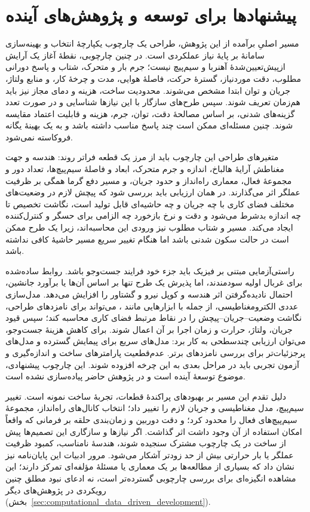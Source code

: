 \section{پیشنهادها برای توسعه و پژوهش‌های آینده}

مسیر اصلیِ برآمده از این پژوهش، طراحی یک چارچوب یکپارچهٔ انتخاب و بهینه‌سازی سامانهٔ  بر پایهٔ نیاز عملکردی است. در چنین چارچوبی، نقطهٔ آغاز یک آرایش ازپیش‌تعیین‌شدهٔ آهنربا و سیم‌پیچ نیست؛ جرم بار و متحرک، شتاب و پاسخ دورانی مطلوب، دقت موردنیاز، گسترهٔ حرکت، فاصلهٔ هوایی، مدت و چرخهٔ کار، و منابع ولتاژ، جریان و توان ابتدا مشخص می‌شوند. محدودیت ساخت، هزینه و دمای مجاز نیز باید هم‌زمان تعریف شوند. سپس طرح‌های سازگار با این نیازها شناسایی و در صورت تعدد گزینه‌های شدنی، بر اساس مصالحهٔ دقت، توان، جرم، هزینه و قابلیت اعتماد مقایسه شوند. چنین مسئله‌ای ممکن است چند پاسخ مناسب داشته باشد و به یک بهینهٔ یگانه فروکاسته نمی‌شود.

متغیرهای طراحی این چارچوب باید از مرز یک قطعه فراتر روند: هندسه و جهت مغناطش آرایهٔ هالباخ، اندازه و جرم متحرک، ابعاد و فاصلهٔ سیم‌پیچ‌ها، تعداد دور و مجموعهٔ فعال، معماری راه‌انداز و حدود جریان، و مسیر دفع گرما همگی بر ظرفیت عملگر اثر می‌گذارند. در همان ارزیابی باید بررسی شود که پیچش لازم در وضعیت‌های مختلف فضای کاری با چه جریان و چه حاشیه‌ای قابل تولید است، نگاشت تخصیص تا چه اندازه بدشرط می‌شود و دقت و نرخ بازخورد چه الزامی برای حسگر و کنترل‌کننده ایجاد می‌کند. مسیر و شتاب مطلوب نیز ورودی این محاسبه‌اند، زیرا یک طرح ممکن است در حالت سکون شدنی باشد اما هنگام تغییر سریع مسیر حاشیهٔ کافی نداشته باشد.

راستی‌آزمایی مبتنی بر فیزیک باید جزء خود فرایند جست‌وجو باشد. روابط ساده‌شده برای غربال اولیه سودمندند، اما پذیرش یک طرح تنها بر اساس آن‌ها یا برآورد جانشین، احتمال نادیده‌گرفتن اثر هندسه و کوپل نیرو و گشتاور را افزایش می‌دهد. مدل‌سازی عددی الکترومغناطیسی، از جمله با ابزارهایی مانند ، می‌تواند برای نامزدهای طراحی، نگاشت وضعیت--جریان--پیچش را در نقاط مرتبط فضای کاری محاسبه کند؛ سپس قیود جریان، ولتاژ، حرارت و زمان اجرا بر آن اعمال شوند. برای کاهش هزینهٔ جست‌وجو، می‌توان ارزیابی چندسطحی به کار برد: مدل‌های سریع برای پیمایش گسترده و مدل‌های پرجزئیات‌تر برای بررسی نامزدهای برتر. عدم‌قطعیت پارامترهای ساخت و اندازه‌گیری و آزمون تجربی باید در مراحل بعدی به این چرخه افزوده شوند. این چارچوب پیشنهادی، موضوع توسعهٔ آینده است و در پژوهش حاضر پیاده‌سازی نشده است.

دلیل تقدم این مسیر بر بهبودهای پراکندهٔ قطعات، تجربهٔ ساخت نمونه است. تغییر سیم‌پیچ، مدل مغناطیسی و جریان لازم را تغییر داد؛ انتخاب کانال‌های راه‌انداز، مجموعهٔ سیم‌پیچ‌های فعال را محدود کرد؛ و دقت دوربین و زمان‌بندی حلقه بر فرمانی که واقعاً امکان استفاده از آن وجود داشت اثر گذاشت. اگر نیازها و سازگاری این تصمیم‌ها پیش از ساخت در یک چارچوب مشترک سنجیده شوند، هندسهٔ نامناسب، کمبود ظرفیت عملگر یا بار حرارتی بیش از حد زودتر آشکار می‌شود. مرور ادبیات این پایان‌نامه نیز نشان داد که بسیاری از مطالعه‌ها بر یک معماری یا مسئلهٔ مؤلفه‌ای تمرکز دارند؛ این مشاهده انگیزه‌ای برای بررسی چارچوبی گسترده‌تر است، نه ادعای نبود مطلق چنین رویکردی در پژوهش‌های دیگر (بخش~\ref{sec:computational_data_driven_development}).

